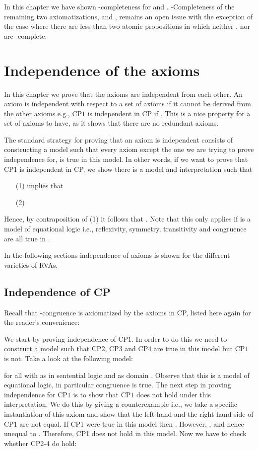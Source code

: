 \documentclass[a4paper,twoside,openright]{report}
\newcommand{\CP}[1]{\ensuremath{\mathrm{CP#1}}}
\begin{document}
In this chapter we have shown -completeness for  and . -Completeness of the remaining two axiomatizations,  and , remains an open issue with the exception of the case where there are less than two atomic propositions in which neither ,  nor  are -complete.

\chapter{Independence of the axioms}
In this chapter we prove that the axioms are independent from each other. An axiom is independent with respect to a set of axioms if it cannot be derived from the other axioms e.g., \CP1 is independent in CP if . This is a nice property for a set of axioms to have, as it shows that there are no redundant axioms.

The standard strategy for proving that an axiom is independent consists of constructing a model such that every axiom except the one we are trying to prove independence for, is true in this model. In other words, if we want to prove that CP1 is independent in CP, we show there is a model  and interpretation  such that
\begin{itemize}
\item[(1)]  implies that 
\item[(2)] 
\end{itemize}
Hence, by contraposition of (1) it follows that . Note that this only applies if  is a model of equational logic i.e., reflexivity, symmetry, transitivity and congruence are all true in .

In the following sections independence of axioms is shown for the different varieties of RVAs.

\section{Independence of CP}
Recall that -congruence is axiomatized by the axioms in CP, listed here again for the reader's convenience:

We start by proving independence of \CP1. In order to do this we need to construct a model such that \CP2, \CP3 and \CP4 are true in this model but \CP1 is not. Take a look at the following model:

for all  with  as in sentential logic and as domain . Observe that this is a model of equational logic, in particular congruence is true. The next step in proving independence for \CP1 is to show that \CP1 does not hold under this interpretation. We do this by giving a counterexample i.e., we take a specific instantiation of this axiom and show that the left-hand and the right-hand side of \CP1 are not equal. If CP1 were true in this model then . However, , and hence unequal to . Therefore, CP1 does not hold in this model. Now we have to check whether CP2-4 do hold:
\end{document}

